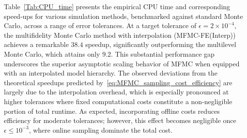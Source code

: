 Table~\ref{Tab:CPU_time} presents the empirical CPU time and corresponding speed-ups for various simulation methods, benchmarked against standard Monte Carlo, across a range of error tolerances. At a target tolerance of $\epsilon = 2\times 10^{-4}$, the multifidelity Monte Carlo method with interpolation (MFMC-FE(Interp)) achieves a remarkable $38.4$ speedup, significantly outperforming the multilevel Monte Carlo, which attains only $9.2$. This substantial performance gap underscores the superior asymptotic scaling behavior of MFMC when equipped with an interpolated model hierarchy. The observed deviations from the theoretical speedups predicted by~\eqref{eq:MFMC_sampling_cost_efficiency} are largely due to the interpolation overhead, which is especially pronounced at higher tolerances where fixed computational costs constitute a non-negligible portion of total runtime. As expected, incorporating offline costs reduces efficiency for moderate tolerances; however, this effect becomes negligible once $\epsilon \leq 10^{-3}$, where online sampling dominate the total cost.
%
